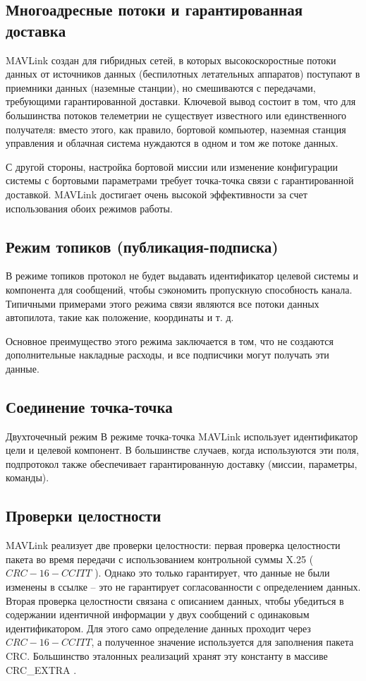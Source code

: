 \subsection{Многоадресные потоки и гарантированная доставка}
MAVLink создан для гибридных сетей, в которых высокоскоростные потоки данных от источников данных (беспилотных летательных аппаратов) поступают в приемники данных (наземные станции), но смешиваются с передачами, требующими гарантированной доставки. Ключевой вывод состоит в том, что для большинства потоков телеметрии не существует известного или единственного получателя: вместо этого, как правило, бортовой компьютер, наземная станция управления и облачная система нуждаются в одном и том же потоке данных.

С другой стороны, настройка бортовой миссии или изменение конфигурации системы с бортовыми параметрами требует точка-точка связи с гарантированной доставкой. MAVLink достигает очень высокой эффективности за счет использования обоих режимов работы.

\subsection{Режим топиков (публикация-подписка)}
В режиме топиков протокол не будет выдавать идентификатор целевой системы и компонента для сообщений, чтобы сэкономить пропускную способность канала. Типичными примерами этого режима связи являются все потоки данных автопилота, такие как положение, координаты и т. д.

Основное преимущество этого режима заключается в том, что не создаются дополнительные накладные расходы, и все подписчики могут получать эти данные.
\subsection{Соединение точка-точка}%
Двухточечный режим
В режиме точка-точка MAVLink использует идентификатор цели и целевой компонент. В большинстве случаев, когда используются эти поля, подпротокол также обеспечивает гарантированную доставку (миссии, параметры, команды).

\subsection{Проверки целостности}
MAVLink реализует две проверки целостности: первая проверка целостности пакета во время передачи с использованием контрольной суммы X.25 ( $CRC-16-CCITT$ ). Однако это только гарантирует, что данные не были изменены в ссылке -- это не гарантирует согласованности с определением данных. Вторая проверка целостности связана с описанием данных, чтобы убедиться в содержании идентичной информации у двух сообщений с одинаковым идентификатором. Для этого само определение данных проходит через $CRC-16-CCITT$, а полученное значение используется для заполнения пакета CRC. Большинство эталонных реализаций хранят эту константу в массиве CRC\_EXTRA . \cite{mavlink}


